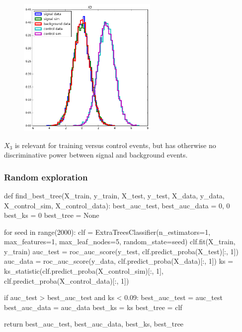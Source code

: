 \documentclass{beamer}
\begin{document}

\begin{frame}

\begin{figure}
\centering
\includegraphics[width=0.6\textwidth]{figures/x3.png}
\end{figure}

$X_3$ is relevant for training versus control events, but has otherwise no
discriminative power between signal and background events.

\end{frame}


\begin{frame}[fragile]
\frametitle{Random exploration}

{\scriptsize
\begin{pythoncode}
def find_best_tree(X_train, y_train, X_test, y_test,
                   X_data, y_data, X_control_sim, X_control_data):
    best_auc_test, best_auc_data = 0, 0
    best_ks = 0
    best_tree = None

    for seed in range(2000):
        clf = ExtraTreesClassifier(n_estimators=1, max_features=1,
                                   max_leaf_nodes=5, random_state=seed)
        clf.fit(X_train, y_train)
        auc_test = roc_auc_score(y_test, clf.predict_proba(X_test)[:, 1])
        auc_data = roc_auc_score(y_data, clf.predict_proba(X_data)[:, 1])
        ks = ks_statistic(clf.predict_proba(X_control_sim)[:, 1],
                          clf.predict_proba(X_control_data)[:, 1])

        if auc_test > best_auc_test and ks < 0.09:
            best_auc_test = auc_test
            best_auc_data = auc_data
            best_ks = ks
            best_tree = clf

    return best_auc_test, best_auc_data, best_ks, best_tree
\end{pythoncode}
}

\end{frame}
\end{document}
